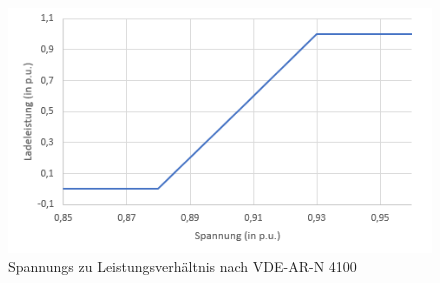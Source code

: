 \begin{figure}[htb]
	\includegraphics[width=\linewidth]{img/VDE3.png}
	\caption{Spannungs zu Leistungsverhältnis nach VDE-AR-N 4100}
	\label{Abb_VDEController}
\end{figure}

